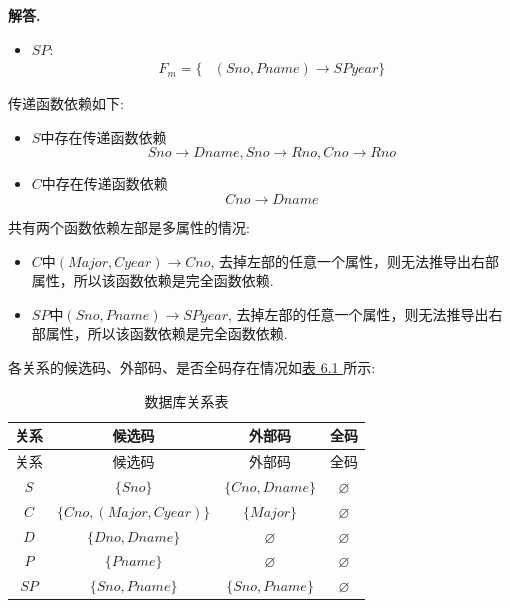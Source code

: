 \documentclass[12pt, oneside]{ctexart}
\numberwithin{figure}{section}
\numberwithin{table}{section}
\newenvironment{solution}{\par\noindent\textbf{解答. }}{\par}
\begin{document}
\begin{solution}
\begin{itemize}
        \item $SP$:
            $$
                \begin{aligned}
                    F_m = \{
                    & (Sno, Pname) \rightarrow SPyear \}
                \end{aligned}
            $$
    \end{itemize}
    \newpage
    传递函数依赖如下:
        \begin{itemize}
            \item $S$中存在传递函数依赖
                $$Sno \rightarrow Dname, Sno \rightarrow Rno, Cno \rightarrow Rno$$
            \item $C$中存在传递函数依赖
                $$Cno \rightarrow Dname$$
        \end{itemize}
    共有两个函数依赖左部是多属性的情况:
        \begin{itemize}
            \item $C$中$(Major, Cyear) \rightarrow Cno$, 去掉左部的任意一个属性，则无法推导出右部属性，所以该函数依赖是完全函数依赖.
            \item $SP$中$(Sno, Pname) \rightarrow SPyear$, 去掉左部的任意一个属性，则无法推导出右部属性，所以该函数依赖是完全函数依赖.
        \end{itemize}
    
    各关系的候选码、外部码、是否全码存在情况如\hyperref[tab:database_relations]{表 6.1 }所示:
    
    \begin{longtable}{|c|c|c|c|}
        \caption{数据库关系表}\label{tab:database_relations} \\
        \hline
        关系 & 候选码 & 外部码 & 全码 \\
        \hline
        \endfirsthead
        \hline
        关系 & 候选码 & 外部码 & 全码 \\
        \hline
        \endhead
        \hline
        \endfoot
        \hline
        \endlastfoot
        $S$ & $\{ Sno \}$ & $\{ Cno, Dname \}$ & $\varnothing$ \\
        $C$ & $\{ Cno, (Major, Cyear) \}$ & $\{ Major \}$ & $\varnothing$ \\
        $D$ & $\{ Dno, Dname \}$ & $\varnothing$ & $\varnothing$ \\
        $P$ & $\{ Pname \}$ & $\varnothing$ & $\varnothing$ \\
        $SP$ & $\{ Sno, Pname \}$ & $\{ Sno, Pname \}$ & $\varnothing$ \\
    \end{longtable}
\end{solution}
\end{document}
